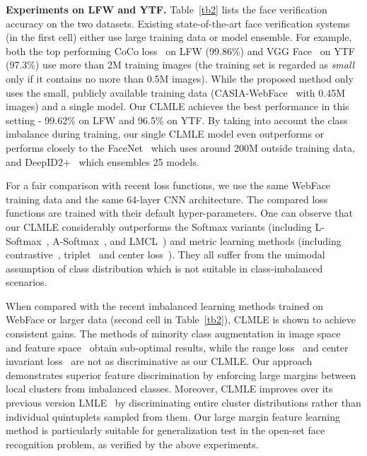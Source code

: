 \documentclass[10pt,journal,compsoc]{IEEEtran}
\begin{document}
\noindent
{\bf Experiments on LFW and YTF.} Table~\ref{tb2} lists the face verification accuracy on the two datasets. Existing state-of-the-art face verification systems (in the first cell) either use large training data or model ensemble. For example, both the top performing CoCo loss~\cite{liu_2017_coco_v2} on LFW (99.86\%) and VGG Face~\cite{Parkhi15} on YTF (97.3\%) use more than 2M training images (the training set is regarded as \textit{small} only if it contains no more than 0.5M images). While the proposed method only uses the small, publicly available training data (CASIA-WebFace~\cite{YiLLL14a} with 0.45M images) and a single model. Our CLMLE achieves the best performance in this setting - 99.62\% on LFW and 96.5\% on YTF. By taking into account the class imbalance during training, our single CLMLE model even outperforms or performs closely to the FaceNet~\cite{Schroff15} which uses around 200M outside training data, and DeepID2+~\cite{SunWT15} which ensembles 25 models.

For a fair comparison with recent loss functions, we use the same WebFace training data and the same 64-layer CNN architecture. The compared loss functions are trained with their default hyper-parameters. One can observe that our CLMLE considerably outperforms the Softmax variants (including L-Softmax~\cite{Liu2016}, A-Softmax~\cite{liu2017sphereface}, and LMCL~\cite{2018Wang}) and metric learning methods (including contrastive~\cite{Yi14}, triplet~\cite{Schroff15} and center loss~\cite{wen2016}). They all suffer from the unimodal assumption of class distribution which is not suitable in class-imbalanced scenarios.

When compared with the recent imbalanced learning methods trained on WebFace or larger data (second cell in Table~\ref{tb2}), CLMLE is shown to achieve consistent gains. The methods of minority class augmentation in image space~\cite{2016_dowe} and feature space~\cite{2018arXiv180309014Y} obtain sub-optimal results, while the range loss~\cite{Zhang_8237840} and center invariant loss~\cite{Wu_2017} are not as discriminative as our CLMLE. Our approach demonstrates superior feature discrimination by enforcing large margins between local clusters from imbalanced classes. Moreover, CLMLE improves over its previous version LMLE~\cite{huang2016lmle} by discriminating entire cluster distributions rather than individual quintuplets sampled from them. Our large margin feature learning method is particularly suitable for generalization test in the open-set face recognition problem, as verified by the above experiments.
\end{document}
